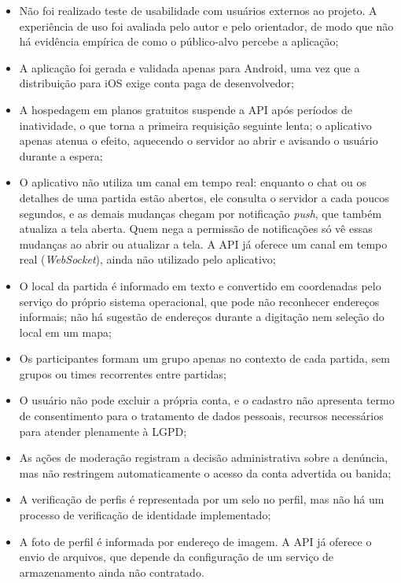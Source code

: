 \documentclass[a4paper, 12pt]{article}
\begin{document}
\begin{justify}
\begin{itemize}
    \item Não foi realizado teste de usabilidade com usuários externos ao projeto. A experiência de uso foi avaliada pelo autor e pelo orientador, de modo que não há evidência empírica de como o público-alvo percebe a aplicação;
    \item A aplicação foi gerada e validada apenas para Android, uma vez que a distribuição para iOS exige conta paga de desenvolvedor;
    \item A hospedagem em planos gratuitos suspende a API após períodos de inatividade, o que torna a primeira requisição seguinte lenta; o aplicativo apenas atenua o efeito, aquecendo o servidor ao abrir e avisando o usuário durante a espera;
    \item O aplicativo não utiliza um canal em tempo real: enquanto o chat ou os detalhes de uma partida estão abertos, ele consulta o servidor a cada poucos segundos, e as demais mudanças chegam por notificação \textit{push}, que também atualiza a tela aberta. Quem nega a permissão de notificações só vê essas mudanças ao abrir ou atualizar a tela. A API já oferece um canal em tempo real (\textit{WebSocket}), ainda não utilizado pelo aplicativo;
    \item O local da partida é informado em texto e convertido em coordenadas pelo serviço do próprio sistema operacional, que pode não reconhecer endereços informais; não há sugestão de endereços durante a digitação nem seleção do local em um mapa;
    \item Os participantes formam um grupo apenas no contexto de cada partida, sem grupos ou times recorrentes entre partidas;
    \item O usuário não pode excluir a própria conta, e o cadastro não apresenta termo de consentimento para o tratamento de dados pessoais, recursos necessários para atender plenamente à LGPD;
    \item As ações de moderação registram a decisão administrativa sobre a denúncia, mas não restringem automaticamente o acesso da conta advertida ou banida;
    \item A verificação de perfis é representada por um selo no perfil, mas não há um processo de verificação de identidade implementado;
    \item A foto de perfil é informada por endereço de imagem. A API já oferece o envio de arquivos, que depende da configuração de um serviço de armazenamento ainda não contratado.
\end{itemize}


\end{justify}
\end{document}
